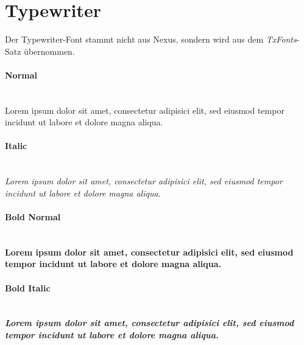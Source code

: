 \documentclass{scrartcl}
\begin{document}
\section*{Typewriter}

Der Typewriter-Font stammt nicht aus Nexus, sondern wird aus dem
\emph{TxFonts}-Satz übernommen.

\paragraph{Normal}\hfill\\
{\ttfamily
Lorem ipsum dolor sit amet, consectetur adipisici elit, sed eiusmod tempor
incidunt ut labore et dolore magna aliqua.
}

\paragraph{Italic}\hfill\\
{\ttfamily\itshape%
Lorem ipsum dolor sit amet, consectetur adipisici elit, sed eiusmod tempor
incidunt ut labore et dolore magna aliqua.
}


\paragraph{Bold Normal}\hfill\\
{\ttfamily\bfseries%
Lorem ipsum dolor sit amet, consectetur adipisici elit, sed eiusmod tempor
incidunt ut labore et dolore magna aliqua.
}

\paragraph{Bold Italic}\hfill\\
{\ttfamily\bfseries\itshape%
Lorem ipsum dolor sit amet, consectetur adipisici elit, sed eiusmod tempor
incidunt ut labore et dolore magna aliqua.
}


% 
% 
% 
% 
% 
\end{document}
